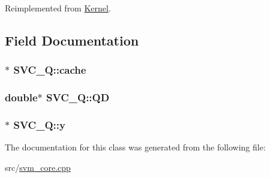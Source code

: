Reimplemented from \hyperlink{classKernel_adca807c5584bc42fd098cd9eb1f19621}{Kernel}.



\subsection{Field Documentation}
\subsubsection[{cache}]{$\ast$ S\+V\+C\+\_\+\+Q\+::cache\hspace{0.3cm}{\ttfamily [private]}}\hypertarget{classSVC__Q_a70e4787695cadf49495accdd36fb140f}{}\label{classSVC__Q_a70e4787695cadf49495accdd36fb140f}
\subsubsection[{QD}]{\setlength{\rightskip}{0pt plus 5cm}double$\ast$ S\+V\+C\+\_\+\+Q\+::\+QD\hspace{0.3cm}{\ttfamily [private]}}\hypertarget{classSVC__Q_a635d129ea1d840296db2e8e1d4ada404}{}\label{classSVC__Q_a635d129ea1d840296db2e8e1d4ada404}
\subsubsection[{y}]{$\ast$ S\+V\+C\+\_\+\+Q\+::y\hspace{0.3cm}{\ttfamily [private]}}\hypertarget{classSVC__Q_a6a37679890a665d32286a3ab047fc0f4}{}\label{classSVC__Q_a6a37679890a665d32286a3ab047fc0f4}


The documentation for this class was generated from the following file\+:\begin{DoxyCompactItemize}
\item 
src/\hyperlink{svm__core_8cpp}{svm\+\_\+core.\+cpp}\end{DoxyCompactItemize}
